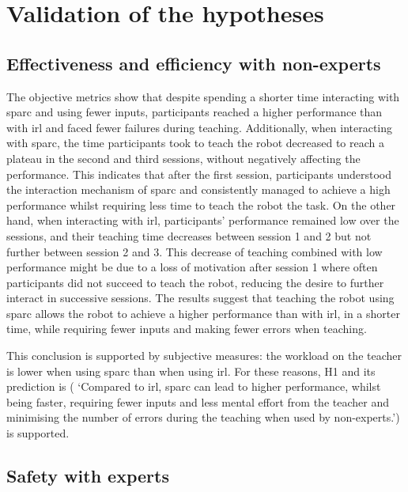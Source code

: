
\section{Validation of the hypotheses}

\subsection{Effectiveness and efficiency with non-experts}
The objective metrics show that despite spending a shorter time interacting with \gls{sparc} and using fewer inputs, participants reached a higher performance than with \gls{irl} and faced fewer failures during teaching. Additionally, when interacting with \gls{sparc}, the time participants took to teach the robot decreased to reach a plateau in the second and third sessions, without negatively affecting the performance. This indicates that after the first session, participants understood the interaction mechanism of \gls{sparc} and consistently managed to achieve a high performance whilst requiring less time to teach the robot the task. On the other hand, when interacting with \gls{irl}, participants' performance remained low over the sessions, and their teaching time decreases between session 1 and 2 but not further between session 2 and 3. This decrease of teaching combined with low performance might be due to a loss of motivation after session 1 where often participants did not succeed to teach the robot, reducing the desire to further interact in successive sessions. The results suggest that teaching the robot using \gls{sparc} allows the robot to achieve a higher performance than with \gls{irl}, in a shorter time, while requiring fewer inputs and making fewer errors when teaching. 

This conclusion is supported by subjective measures: the workload on the teacher is lower when using \gls{sparc} than when using \gls{irl}. For these reasons, H1 and its prediction is ( `Compared to \gls{irl}, \gls{sparc} can lead to higher performance, whilst being faster, requiring fewer inputs and less mental effort from the teacher and minimising the number of errors during the teaching when used by non-experts.') is supported.

\subsection{Safety with experts}

